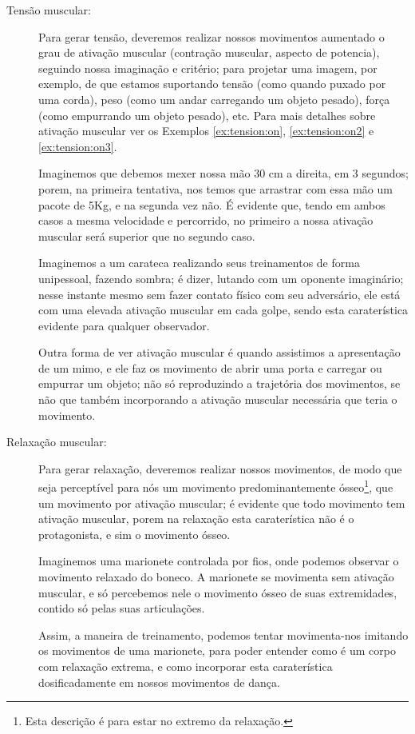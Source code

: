 \begin{description}
\item[Tensão muscular:] Para gerar tensão, 
deveremos realizar nossos movimentos aumentado o grau de ativação muscular (contração muscular, aspecto de potencia), 
seguindo nossa imaginação e  critério;
para projetar uma imagem, por exemplo, de que estamos suportando tensão (como quando puxado por uma corda), 
peso (como um andar carregando um objeto pesado), força (como empurrando um objeto pesado), etc.
Para mais detalhes sobre ativação muscular ver os  Exemplos \ref{ex:tension:on}, \ref{ex:tension:on2} e \ref{ex:tension:on3}.
\begin{example}
\label{ex:tension:on}
Imaginemos que debemos mexer nossa mão 30 cm a direita, em 3 segundos;
porem, na primeira tentativa, nos temos que arrastrar com essa mão um pacote de 5Kg,
e na segunda vez não.
É evidente que, tendo em ambos casos a mesma velocidade e percorrido,
no primeiro a nossa ativação muscular será superior que no segundo caso.
\end{example}
\begin{example}
\label{ex:tension:on2}
Imaginemos a um carateca realizando seus treinamentos de forma unipessoal, 
fazendo sombra; é dizer, lutando com um oponente imaginário;
nesse instante mesmo sem fazer contato físico com seu adversário,
ele está com uma elevada ativação muscular em cada golpe,
sendo esta caraterística evidente para qualquer  observador.
\end{example}
\begin{example}
\label{ex:tension:on3}
Outra forma de ver ativação muscular é quando assistimos a apresentação de um mimo,
e ele faz os movimento de  abrir uma porta e carregar ou empurrar um objeto;
não só reproduzindo a trajetória dos movimentos, 
se não que também incorporando a ativação muscular necessária que teria o movimento. 
\end{example}
\item[Relaxação muscular:] Para gerar relaxação, 
deveremos realizar nossos movimentos, 
de modo que seja  perceptível para nós um movimento predominantemente ósseo\footnote{Esta
descrição é para estar no extremo da relaxação.}, 
que um movimento por ativação muscular;
é evidente que todo movimento tem ativação muscular,
porem na relaxação esta caraterística não é o protagonista,
e sim o movimento ósseo.
\begin{example}
Imaginemos uma marionete controlada por fios, 
onde podemos observar o movimento relaxado do boneco.
A marionete se movimenta sem ativação muscular, 
e só percebemos nele o movimento ósseo de suas extremidades, 
contido só pelas suas articulações.

Assim, a maneira de treinamento, 
podemos tentar movimenta-nos imitando os movimentos de uma marionete,
para poder entender como é um corpo com relaxação extrema,
e como incorporar esta caraterística dosificadamente em nossos movimentos de dança.
\end{example} 
\end{description}

